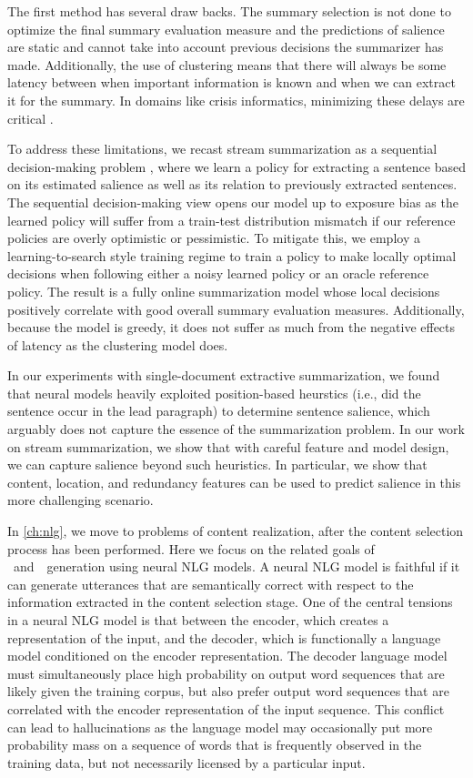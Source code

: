 The first method has several draw backs. The summary selection is not done
to optimize the final summary evaluation measure and the predictions of salience
are static and cannot take into account previous decisions the summarizer
has made. Additionally, the use of clustering means that there will always be 
some latency between when important information is known and when we can
extract it for the summary. In domains like crisis informatics, minimizing
these delays are critical \citep{starbird2013}.

To address these limitations, we recast stream summarization as a sequential
decision-making problem \citep{littman1996}, where we learn a policy for
extracting a sentence based on its estimated salience as well as its relation
to previously extracted sentences.  The sequential decision-making view opens
our model up to exposure bias as the learned policy will suffer from a
train-test distribution mismatch if our reference policies are overly
optimistic or pessimistic.  To mitigate this, we employ a learning-to-search
style training regime \citep{chang2015} to train a policy to make locally optimal
decisions when following either a noisy learned policy or an oracle reference
policy.  The result is a fully online summarization model whose local
decisions positively correlate with good overall summary evaluation measures.
Additionally, because the model is greedy, it does not suffer as much from the
negative effects of latency as the clustering model does.
      

In our experiments with single-document extractive summarization, we found
that neural models heavily exploited position-based heurstics (i.e., did the
sentence occur in the lead paragraph) to determine sentence salience, which
arguably does not capture the essence of the summarization problem. In our
work on stream summarization, we show that with careful feature and model
design, we can capture salience beyond such heuristics.  In particular, we
show that content, location, and redundancy features can be used to predict
salience in this more challenging scenario.
      


In \autoref{ch:nlg}, we move to problems of content realization, after the
content selection process has been performed.  Here we focus on the related
goals of ~and~~generation using neural NLG
models. A neural NLG model is faithful if it can generate utterances that are
semantically correct with respect to the information extracted in the content
selection stage.  One of the central tensions in a neural NLG model is that
between the encoder, which creates a representation of the input, and the
decoder, which is functionally a language model conditioned on the encoder
representation.  The decoder language model must simultaneously place high
probability on output word sequences that are likely given the training
corpus, but also prefer output word sequences that are correlated with the
encoder representation of the input sequence. This conflict can lead to hallucinations as the language model
may occasionally put more probability mass on a sequence of words that is
frequently observed in the training data, but not necessarily licensed by 
a particular
input.

